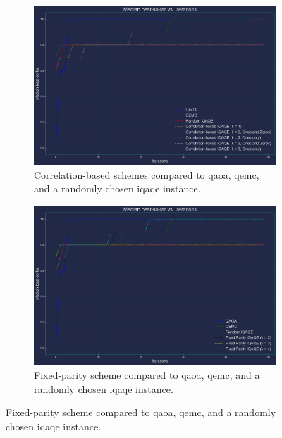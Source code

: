 \begin{figure}[hb!]
    \centering
    \begin{subfigure}[t]{0.495\textwidth}
        \centering
        \includegraphics[width=1\textwidth]{Figures/Appendix_A/8-node/Basic+Correlation_iQAQE(8-node).png}
        \caption{Correlation-based schemes compared to \acrshort{qaoa}, \acrshort{qemc}, and a randomly chosen \acrshort{iqaqe} instance.}
        \label{fig:C_BSF_1_8-node}
    \end{subfigure}
    \hfill
    \begin{subfigure}[t]{0.495\textwidth}
        \centering
        \includegraphics[width=1\textwidth]{Figures/Appendix_A/8-node/Basic+Fixed_Parity_iQAQE(8-node).png}
        \caption{Fixed-parity scheme compared to \acrshort{qaoa}, \acrshort{qemc}, and a randomly chosen \acrshort{iqaqe} instance.}
        \label{fig:C_BSF_2_8-node}
    \end{subfigure}
\end{figure}

